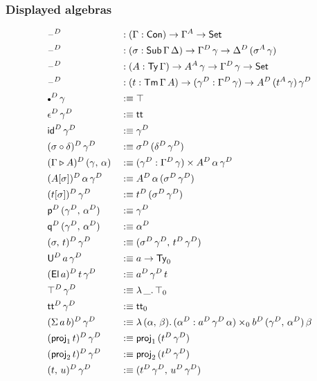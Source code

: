 \documentclass[12pt,a4paper,twoside,openany]{book}
\theoremstyle{remark}
\theoremstyle{definition}
\theoremstyle{theorem}
\newcommand{\id}{\mathsf{id}}
\newcommand{\Con}{\mathsf{Con}}
\newcommand{\Sub}{\mathsf{Sub}}
\newcommand{\Tm}{\mathsf{Tm}}
\newcommand{\Ty}{\mathsf{Ty}}
\newcommand{\U}{\mathsf{U}}
\newcommand{\El}{\mathsf{El}}
\newcommand{\proj}{\mathsf{proj}}
\renewcommand{\tt}{\mathsf{tt}}
\newcommand{\blank}{\mathord{\hspace{1pt}\text{--}\hspace{1pt}}}
\newcommand{\Set}{\mathsf{Set}}
\newcommand{\ext}{\triangleright}
\newcommand{\emptycon}{\scaleobj{.75}\bullet}
\newcommand{\p}{\mathsf{p}}
\newcommand{\q}{\mathsf{q}}
\newcommand{\defn}{:\equiv}
\begin{document}
\subsubsection{Displayed algebras}
\vspace{-0.5em}
\begin{alignat*}{3}
  &\blank^D &&: (\Gamma : \Con) \to \Gamma^A \to \Set\\
  &\blank^D &&: (\sigma : \Sub\,\Gamma\,\Delta) \to \Gamma^D\,\gamma \to \Delta^D\,(\sigma^A\,\gamma) \\
  &\blank^D &&: (A : \Ty\,\Gamma) \to A^A\,\gamma \to \Gamma^D\,\gamma \to \Set\\
  &\blank^D &&: (t : \Tm\,\Gamma\,A) \to (\gamma^D : \Gamma^D\,\gamma) \to A^D\,(t^A\,\gamma)\,\gamma^D\\
  &\emptycon^D\,\gamma &&\defn \top\\
  &\epsilon^D\,\gamma^D &&\defn \tt\\
  &\id^D\,\gamma^D &&\defn \gamma^D\\
  &(\sigma \circ \delta)^D\,\gamma^D &&\defn \sigma^D\,(\delta^D\,\gamma^D)\\
  &(\Gamma \ext A)^D\,(\gamma,\,\alpha) &&\defn (\gamma^D : \Gamma^D\,\gamma) \times A^D\,\alpha\,\gamma^D\\
  &(A[\sigma])^D\,\alpha\,\gamma^D &&\defn A^D\,\alpha\,(\sigma^D\,\gamma^D)\\
  &(t[\sigma])^D\,\gamma^D &&\defn t^D\,(\sigma^D\,\gamma^D)\\
  &\p^D\,(\gamma^D,\,\alpha^D) &&\defn \gamma^D\\
  &\q^D\,(\gamma^D,\,\alpha^D) &&\defn \alpha^D\\
  &(\sigma,\,t)^D\,\gamma^D &&\defn (\sigma^D\,\gamma^D,\,t^D\,\gamma^D)\\
  &\U^D\,a\,\gamma^D &&\defn a \to \Ty_0\\
  &(\El\,a)^D\,t\,\gamma^D &&\defn a^D\,\gamma^D\,t\\
  &\top^D\,\gamma^D &&\defn \lambda\,\_.\,\top_0\\
  &\tt^D\,\gamma^D &&\defn \tt_0\\
  &(\Sigma\,a\,b)^D\,\gamma^D &&\defn \lambda\,(\alpha,\,\beta).\,(\alpha^D : a^D\,\gamma^D\,\alpha)\times_0 b^D\,(\gamma^D,\,\alpha^D)\,\beta\\
  &(\proj_1\,t)^D\,\gamma^D &&\defn \proj_1\,(t^D\,\gamma^D)\\
  &(\proj_2\,t)^D\,\gamma^D &&\defn \proj_2\,(t^D\,\gamma^D)\\
  &(t,\,u)^D\,\gamma^D &&\defn (t^D\,\gamma^D,\,u^D\,\gamma^D)\\

\end{alignat*}
\end{document}
